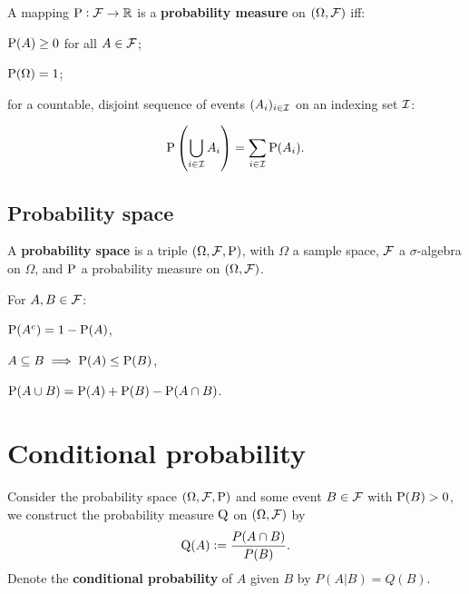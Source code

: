 \documentclass[../Year1/Year1.tex]{subfiles}
\begin{document}
\begingroup\belowdisplayskip=-10pt
    \begin{definition}
        A mapping $\P: \FFF \to \RR$ is a \textbf{probability measure} on $(\Omega, \FFF)$ iff:\\
        \begin{enumerate*}
            \item $\P(A)\geq0$ for all $A\in\FFF$;
            \item $\P(\Omega) = 1$;
            \item for a countable, disjoint sequence of events $(A_i)_{i\in\III}$ on an indexing set $\III$: \\
        \end{enumerate*}
        \[
        \P\left(\bigcup_{i\in\III}A_i\right) = \sum_{i\in\III}\P(A_i)\textcolor{black}{.}
        \]
    \end{definition}
\endgroup

\begingroup\abovedisplayskip=-10pt 
\subsection{Probability space}
\endgroup
\begin{definition}
    A \textbf{probability space} is a triple $(\Omega, \FFF, \P)$, with $\Omega$ a sample space, $\FFF$ a $\sigma$-algebra on $\Omega$, and $\P$ a probability measure on $(\Omega, \FFF)$.
\end{definition}

\begin{corollary} For $A,B \in \FFF$: \newline
    \begin{enumerate*}
        \item $\P(A^c) = 1 - \P(A)$, \hspace{25pt}
        \item $A \subseteq B \implies \P(A) \leq \P(B)$, \hspace{25pt}
        \item $\P(A\cup B) = \P(A) + \P(B) - \P(A\cap B)$.
    \end{enumerate*}
\end{corollary}

\section{Conditional probability}
\begin{definition}
    Consider the probability space $(\Omega, \FFF, \P)$ and some event $B \in \FFF$ with $\P(B) > 0$, we construct the probability measure $\Q$ on $(\Omega, \FFF)$ by \[
        \Q(A):=\frac{P(A\cap B)}{P(B)}\textcolor{black}{.}
    \]
    Denote the \textbf{conditional probability} of $A$ given $B$ by $P(A|B) = Q(B)$.
\end{definition}
\end{document}
